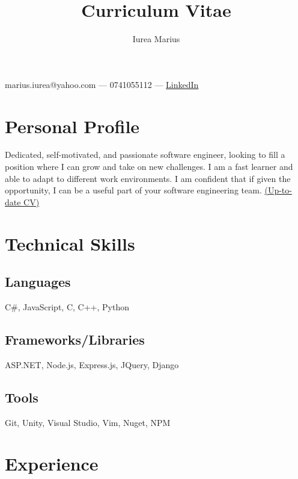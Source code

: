 \documentclass[a4paper,hidelinks,11pt]{article}
\begin{document}
\title{Curriculum Vitae}
\author{Iurea Marius}
\renewcommand{\maketitle}
{
        \begin{center}
        {\huge\bfseries
        \thetitle

        \theauthor}

        marius.iurea@yahoo.com --- 0741055112 --- \href{https://www.linkedin.com/in/marius-iurea-49b7021b5/}{LinkedIn}

        \end{center}
}

\maketitle

\section{Personal Profile}
Dedicated, self-motivated, and passionate software engineer, looking to fill a position where I can grow and take on new
challenges. I am a fast learner and able to adapt to different work environments. I am confident that if given the opportunity, I can be a useful part of your software engineering team. \href{https://github.com/IureaMarius/CV}{(Up-to-date CV)}



\section{Technical Skills}
\subsection{Languages}
C\#, JavaScript, C, C++, Python
\subsection{Frameworks/Libraries}
ASP.NET, Node.js, Express.js, JQuery, Django
\subsection{Tools}
Git, Unity, Visual Studio, Vim, Nuget, NPM

\section{Experience}
\end{document}
